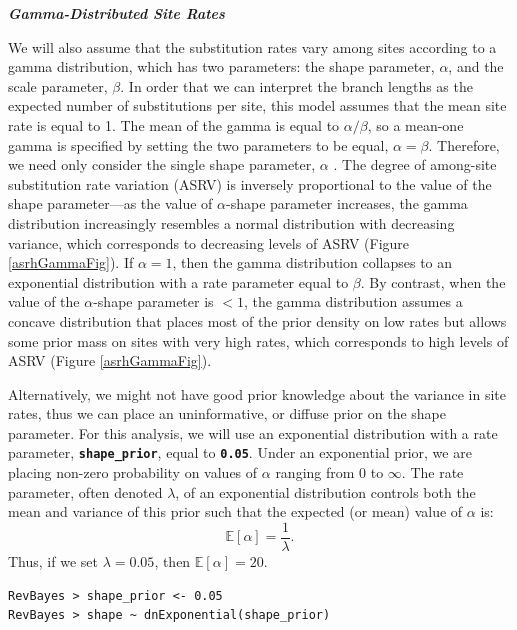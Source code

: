 \documentclass[11pt]{article}
\newcommand{\cl}[1]{{\texttt{\textbf{#1}}}}
\begin{document}
\textbf{\textit{Gamma-Distributed Site Rates}}

We will also assume that the substitution rates vary among sites according to a gamma distribution, which has two parameters: the shape parameter, $\alpha$, and the scale parameter, $\beta$. 
In order that we can interpret the branch lengths as the expected number of substitutions per site, this model assumes that the mean site rate is equal to 1.
The mean of the gamma is equal to $\alpha/\beta$, so a mean-one gamma is specified by setting the two parameters to be equal, $\alpha=\beta$.
Therefore, we need only consider the single shape parameter, $\alpha$ \citep{yang94a}. 
The degree of among-site substitution rate variation (ASRV) is inversely proportional to the value of the shape parameter---as the value of $\alpha$-shape parameter increases, the gamma distribution increasingly resembles a normal distribution with decreasing variance, which corresponds to decreasing levels of ASRV (Figure \ref{asrhGammaFig}).
If $\alpha = 1$, then the gamma distribution collapses to an exponential distribution with a rate parameter equal to $\beta$.
By contrast, when the value of the $\alpha$-shape parameter is $< 1$, the gamma distribution assumes a concave distribution that places most of the prior density on low rates but allows some prior mass on sites with very high rates, which corresponds to high levels of ASRV (Figure \ref{asrhGammaFig}).

Alternatively, we might not have good prior knowledge about the variance in site rates, thus we can place an uninformative, or diffuse prior on the shape parameter.
For this analysis, we will use an exponential distribution with a rate parameter, \cl{shape\_prior}, equal to \cl{0.05}.
Under an exponential prior, we are placing non-zero probability on values of $\alpha$ ranging from 0 to $\infty$. 
The rate parameter, often denoted $\lambda$, of an exponential distribution controls both the mean and variance of this prior such that the expected (or mean) value of $\alpha$ is:
$$\mathbb{E}[\alpha] = \frac{1}{\lambda}.$$
Thus, if we set $\lambda=0.05$, then $\mathbb{E}[\alpha] = 20$.

{\tt\begin{snugshade*}
\begin{lstlisting}
RevBayes > shape_prior <- 0.05                                                                             
RevBayes > shape ~ dnExponential(shape_prior)
\end{lstlisting}
\end{snugshade*}}
\end{document}
